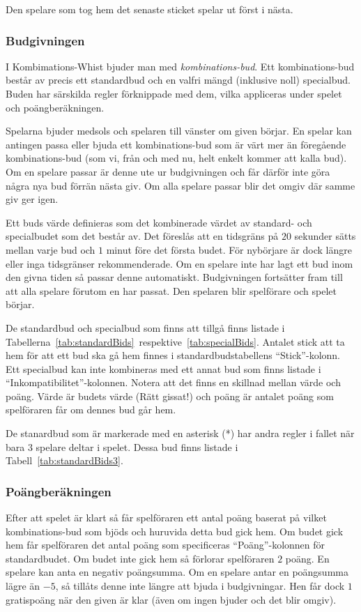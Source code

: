 \documentclass[a4paper]{article}
\begin{document}
{{{				Den spelare som tog hem det senaste sticket spelar ut först i nästa.
			}

			\subsubsection{Budgivningen}{\label{sec:bidding}
				I Kombimations-Whist bjuder man med \emph{kombinations-bud}. Ett kombinations-bud består av precis ett standardbud och en valfri mängd (inklusive noll) specialbud. Buden har särskilda regler förknippade med dem, vilka appliceras under spelet och poängberäkningen.

				Spelarna bjuder medsols och spelaren till vänster om given börjar. En spelar kan antingen passa eller bjuda ett kombinations-bud som är värt mer än föregående kombinations-bud (som vi, från och med nu, helt enkelt kommer att kalla bud). Om en spelare passar är denne ute ur budgivningen och får därför inte göra några nya bud förrän nästa giv. Om alla spelare passar blir det omgiv där samme giv ger igen.

				Ett buds värde definieras som det kombinerade värdet av standard- och specialbudet som det består av. Det föreslås att en tidsgräns på $20$ sekunder sätts mellan varje bud och $1$ minut före det första budet. För nybörjare är dock längre eller inga tidsgränser rekommenderade. Om en spelare inte har lagt ett bud inom den givna tiden så passar denne automatiskt. Budgivningen fortsätter fram till att alla spelare förutom en har passat. Den spelaren blir spelförare och spelet börjar.

				De standardbud och specialbud som finns att tillgå finns listade i Tabellerna~\ref{tab:standardBids}~respektive~\ref{tab:specialBids}. Antalet stick att ta hem för att ett bud ska gå hem finnes i standardbudstabellens ``Stick''-kolonn. Ett specialbud kan inte kombineras med ett annat bud som finns listade i ``Inkompatibilitet''-kolonnen. Notera att det finns en skillnad mellan värde och poäng. Värde är budets värde (Rätt gissat!) och poäng är antalet poäng som spelföraren får om dennes bud går hem.

				De stanardbud som är markerade med en asterisk (*) har andra regler i fallet när bara $3$ spelare deltar i spelet. Dessa bud finns listade i Tabell~\ref{tab:standardBids3}.
			}

			\subsubsection{Poängberäkningen}{%
				Efter att spelet är klart så får spelföraren ett antal poäng baserat på vilket kombinations-bud som bjöds och huruvida detta bud gick hem. Om budet gick hem får spelföraren det antal poäng som specificeras ``Poäng''-kolonnen för standardbudet. Om budet inte gick hem så förlorar spelföraren $2$ poäng. En spelare kan anta en negativ poängsumma. Om en spelare antar en poängsumma lägre än $-5$, så tillåts denne inte längre att bjuda i budgivningar. Hen får dock $1$ gratispoäng när den given är klar (även om ingen bjuder och det blir omgiv).
			}

}}
\end{document}
